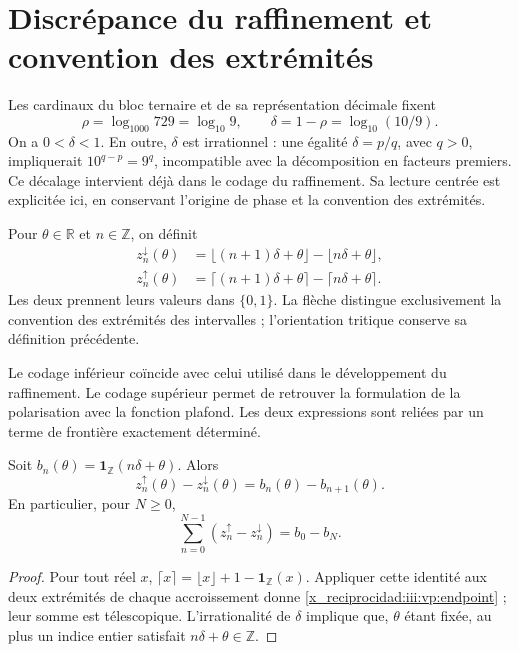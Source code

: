 \section{Discrépance du raffinement et convention des extrémités}

Les cardinaux du bloc ternaire et de sa représentation décimale fixent
\[
 \rho=\log_{1000}729=\log_{10}9,\qquad
 \delta=1-\rho=\log_{10}(10/9).
\]
On a $0<\delta<1$. En outre, $\delta$ est irrationnel : une égalité $\delta=p/q$, avec $q>0$, impliquerait $10^{q-p}=9^q$, incompatible avec la décomposition en facteurs premiers. Ce décalage intervient déjà dans le codage du raffinement. Sa lecture centrée est explicitée ici, en conservant l'origine de phase et la convention des extrémités.

\begin{definition}
Pour $\theta\in\mathbb R$ et $n\in\mathbb Z$, on définit
\begin{align}
 z_n^{\downarrow}(\theta)
 &=\lfloor(n+1)\delta+\theta\rfloor-\lfloor n\delta+\theta\rfloor,
 \label{x_reciprocidad:iii:vp:lower}\\
 z_n^{\uparrow}(\theta)
 &=\lceil(n+1)\delta+\theta\rceil-\lceil n\delta+\theta\rceil.
 \label{x_reciprocidad:iii:vp:upper}
\end{align}
Les deux prennent leurs valeurs dans $\{0,1\}$. La flèche distingue exclusivement la convention des extrémités des intervalles ; l'orientation tritique conserve sa définition précédente.
\end{definition}

Le codage inférieur coïncide avec celui utilisé dans le développement
du raffinement. Le codage supérieur permet de retrouver la formulation de la
polarisation avec la fonction plafond. Les deux expressions sont reliées par
un terme de frontière exactement déterminé.

\begin{proposition}
Soit $b_n(\theta)=\mathbf1_{\mathbb Z}(n\delta+\theta)$. Alors
\begin{equation}
 z_n^{\uparrow}(\theta)-z_n^{\downarrow}(\theta)
 =b_n(\theta)-b_{n+1}(\theta).
 \label{x_reciprocidad:iii:vp:endpoint}
\end{equation}
En particulier, pour $N\geq0$,
\[
 \sum_{n=0}^{N-1}(z_n^{\uparrow}-z_n^{\downarrow})
 =b_0-b_N.
\]
\end{proposition}
\begin{proof}
Pour tout réel $x$, $\lceil x\rceil=\lfloor x\rfloor+1-
\mathbf1_{\mathbb Z}(x)$. Appliquer cette identité aux deux extrémités
de chaque accroissement donne \eqref{x_reciprocidad:iii:vp:endpoint} ; leur somme est télescopique.
L’irrationalité de $\delta$ implique que, $\theta$ étant fixée, au plus
un indice entier satisfait $n\delta+\theta\in\mathbb Z$.
\end{proof}

